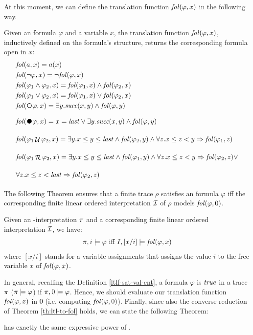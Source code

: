 At this moment, we can define the translation function $\mathit{fol}(\varphi,x)$ in the following way.
\begin{definition}\label{def:ltlf-to-fol}
Given an \LTLf formula $\varphi$ and a variable $x$, the translation function $\mathit{fol}(\varphi,x)$, inductively defined on the \LTLf formula's structure, returns the corresponding \FOL formula open in $x$:
\begin{align*}
&\fol(a,x) = a(x)\\
&\fol(\lnot \varphi, x) = \lnot \fol(\varphi, x)\\
&\fol(\varphi_1 \lAND \varphi_2,x) = \fol(\varphi_1,x) \lAND \fol(\varphi_2,x)\\
&\fol(\varphi_1 \lOR \varphi_2,x) = \fol(\varphi_1,x) \lOR \fol(\varphi_2,x)\\
&\fol(\Next \varphi, x) = \exists y.\suc(x,y) \lAND \fol(\varphi, y)\\
&\fol(\Wnext \varphi, x) = x= \last \lOR \exists y.\suc(x,y) \lAND \fol(\varphi, y)\\
&\fol(\varphi_1 \lUntil \varphi_2, x) = \exists y. x \le y \le \last \lAND \fol(\varphi_2, y) \lAND \forall z.x \le z < y \Rightarrow \fol(\varphi_1,z)\\
&\fol(\varphi_1 \Release \varphi_2, x) = \exists y. x \le y \le \last \lAND \fol(\varphi_1, y) \lAND \forall z.x \le z < y \Rightarrow \fol(\varphi_2,z)  \lOR\\
& \forall z.x \le z < \last \Rightarrow \fol(\varphi_2,z)
\end{align*}
\end{definition}
The following Theorem ensures that a finite trace $\rho$ satisfies an \LTLf formula $\varphi$ iff the corresponding finite linear ordered \FOL interpretation $\mathcal{I}$ of $\rho$ models $\mathit{fol}(\varphi, 0)$.
\begin{theorem}\citep{de2013linear}\label{th:ltl-to-fol}
Given an \LT-interpretation $\pi$ and a corresponding finite linear ordered \FOL interpretation $\mathcal{I}$, we have:
\begin{align*}
\pi,i \models \varphi \ \text{iff}\  I,[x/i] \models \mathit{fol}(\varphi, x)
\end{align*}
where $[x/i]$ stands for a variable assignments that assigns the value $i$ to the free variable $x$ of $\mathit{fol}(\varphi, x)$.
\end{theorem}
In general, recalling the Definition \ref{ltlf-sat-val-ent}, a formula $\varphi$ is $\mathit{true}$ in a trace $\pi$ ($\pi \models \varphi$) if $\pi, 0 \models \varphi$. Hence, we should evaluate our translation function $\mathit{fol}(\varphi, x)$ in $0$ (i.e. computing $\mathit{fol}(\varphi, 0)$).
Finally, since also the converse reduction of Theorem \ref{th:ltl-to-fol} holds, we can state the following Theorem:
\begin{theorem}\citep{gabbay1980temporal}\label{th:ltl-fol-expressive}
\LTLf has exactly the same expressive power of \FOL.
\end{theorem}
